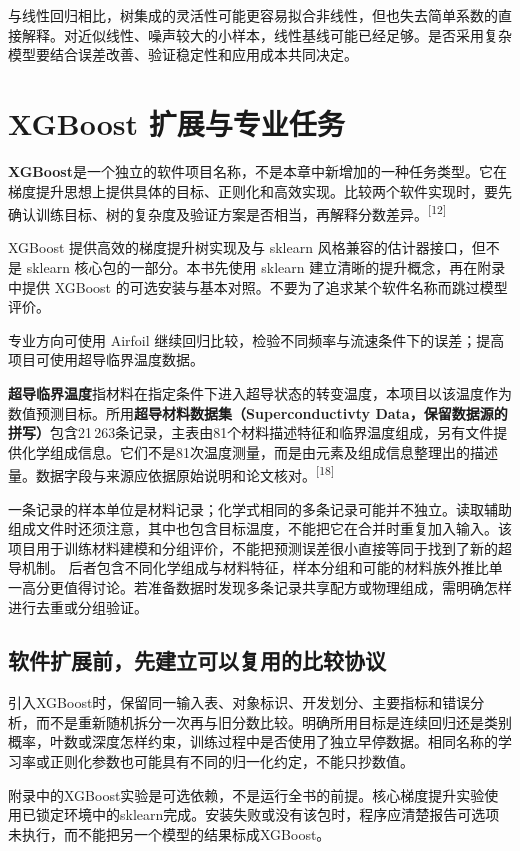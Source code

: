 与线性回归相比，树集成的灵活性可能更容易拟合非线性，但也失去简单系数的直接解释。对近似线性、噪声较大的小样本，线性基线可能已经足够。是否采用复杂模型要结合误差改善、验证稳定性和应用成本共同决定。

\section{XGBoost 扩展与专业任务}

\textbf{XGBoost}是一个独立的软件项目名称，不是本章中新增加的一种任务类型。它在梯度提升思想上提供具体的目标、正则化和高效实现。比较两个软件实现时，要先确认训练目标、树的复杂度及验证方案是否相当，再解释分数差异。\textsuperscript{[12]}

XGBoost 提供高效的梯度提升树实现及与 sklearn 风格兼容的估计器接口，但不是 sklearn 核心包的一部分。本书先使用 sklearn 建立清晰的提升概念，再在附录中提供 XGBoost 的可选安装与基本对照。不要为了追求某个软件名称而跳过模型评价。

专业方向可使用 Airfoil 继续回归比较，检验不同频率与流速条件下的误差；提高项目可使用超导临界温度数据。

\label{sec:superconduct-intro}
\textbf{超导临界温度}指材料在指定条件下进入超导状态的转变温度，本项目以该温度作为数值预测目标。所用\textbf{超导材料数据集（Superconductivty Data，保留数据源的拼写）}包含21\,263条记录，主表由81个材料描述特征和临界温度组成，另有文件提供化学组成信息。它们不是81次温度测量，而是由元素及组成信息整理出的描述量。数据字段与来源应依据原始说明和论文核对。\textsuperscript{[18]}

一条记录的样本单位是材料记录；化学式相同的多条记录可能并不独立。读取辅助组成文件时还须注意，其中也包含目标温度，不能把它在合并时重复加入输入。该项目用于训练材料建模和分组评价，不能把预测误差很小直接等同于找到了新的超导机制。
后者包含不同化学组成与材料特征，样本分组和可能的材料族外推比单一高分更值得讨论。若准备数据时发现多条记录共享配方或物理组成，需明确怎样进行去重或分组验证。

\subsection{软件扩展前，先建立可以复用的比较协议}
引入XGBoost时，保留同一输入表、对象标识、开发划分、主要指标和错误分析，而不是重新随机拆分一次再与旧分数比较。明确所用目标是连续回归还是类别概率，叶数或深度怎样约束，训练过程中是否使用了独立早停数据。相同名称的学习率或正则化参数也可能具有不同的归一化约定，不能只抄数值。

附录中的XGBoost实验是可选依赖，不是运行全书的前提。核心梯度提升实验使用已锁定环境中的sklearn完成。安装失败或没有该包时，程序应清楚报告可选项未执行，而不能把另一个模型的结果标成XGBoost。

